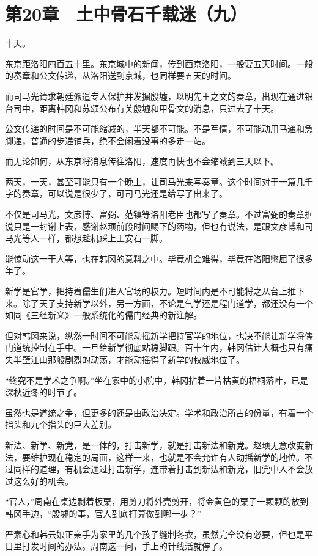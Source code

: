 \section{第20章　土中骨石千载迷（九）}

十天。

东京距洛阳四百五十里。东京城中的新闻，传到西京洛阳，一般要五天时间。一般的奏章和公文传递，从洛阳送到京城，也同样要五天的时间。

而司马光请求朝廷派遣专人保护并发掘殷墟，以明先王之文的奏章，出现在通进银台司中，距离韩冈和苏颂公布有关殷墟和甲骨文的消息，只过去了十天。

公文传递的时间是不可能缩减的，半天都不可能。不是军情，不可能动用马递和急脚递，普通的步递铺兵，绝不会闲着没事的多走一站。

而无论如何，从东京将消息传往洛阳，速度再快也不会缩减到三天以下。

两天，一天，甚至可能只有一个晚上，让司马光来写奏章。这个时间对于一篇几千字的奏章，可以说是很少了，可司马光还是给写了出来了。

不仅是司马光，文彦博、富弼、范镇等洛阳老臣也都写了奏章。不过富弼的奏章据说只是一封谢上表，感谢赵顼前段时间赐下的药物，但也有说法，是跟文彦博和司马光等人一样，都想趁机踩上王安石一脚。

能惊动这一干人等，也在韩冈的意料之中。毕竟机会难得，毕竟在洛阳憋屈了很多年了。

新学是官学，把持着儒生们进入官场的权力。短时间内是不可能将之从台上推下来。除了天子支持新学以外，另一方面，不论是气学还是程门道学，都还没有一个如同《三经新义》一般系统化的儒门经典的新注解。

但对韩冈来说，纵然一时间不可能动摇新学把持官学的地位，也决不能让新学将儒门道统控制在手中。一旦给新学彻底站稳脚跟。百十年内，韩冈估计大概也只有痛失半壁江山那般剧烈的动荡，才能动摇得了新学的权威地位了。

“终究不是学术之争啊。”坐在家中的小院中，韩冈拈着一片枯黄的梧桐落叶，已是深秋近冬的时节了。

虽然也是道统之争，但更多的还是由政治决定。学术和政治所占的份量，有着一个指头和九个指头的巨大差别。

新法、新学、新党，是一体的，打击新学，就是打击新法和新党。赵顼无意改变新法，要维护现在稳定的局面，这样一来，也就是不会允许有人动摇新学的地位。不过同样的道理，有机会通过打击新学，连带着打击到新法和新党，旧党中人不会放过这么好的机会。

“官人，”周南在桌边剥着板栗，用剪刀将外壳剪开，将金黄色的栗子一颗颗的放到韩冈手边，“殷墟的事，官人到底打算做到哪一步？”

严素心和韩云娘正亲手为家里的几个孩子缝制冬衣，虽然完全没有必要，但也是平日里打发时间的办法。周南这一问，手上的针线活就停了。

